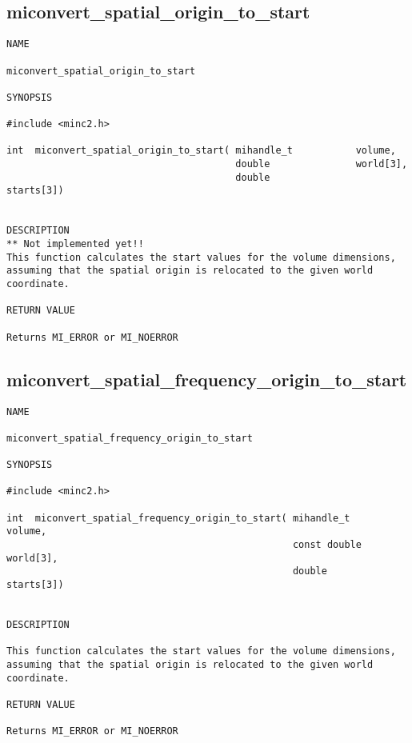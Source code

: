 \documentclass{article}
\begin{document}
\subsection{miconvert\_spatial\_origin\_to\_start}
\begin{verbatim}
NAME 

miconvert_spatial_origin_to_start

SYNOPSIS

#include <minc2.h>

int  miconvert_spatial_origin_to_start( mihandle_t           volume,
                                        double               world[3],
                                        double               starts[3])
                       
                                
DESCRIPTION
** Not implemented yet!!
This function calculates the start values for the volume dimensions,
assuming that the spatial origin is relocated to the given world
coordinate.

RETURN VALUE

Returns MI_ERROR or MI_NOERROR

\end{verbatim}

\subsection{miconvert\_spatial\_frequency\_origin\_to\_start}
\begin{verbatim}
NAME 

miconvert_spatial_frequency_origin_to_start

SYNOPSIS

#include <minc2.h>

int  miconvert_spatial_frequency_origin_to_start( mihandle_t         volume,
                                                  const double       world[3],
                                                  double             starts[3])
                       
                                
DESCRIPTION

This function calculates the start values for the volume dimensions,
assuming that the spatial origin is relocated to the given world
coordinate.

RETURN VALUE

Returns MI_ERROR or MI_NOERROR

\end{verbatim}
\end{document}
